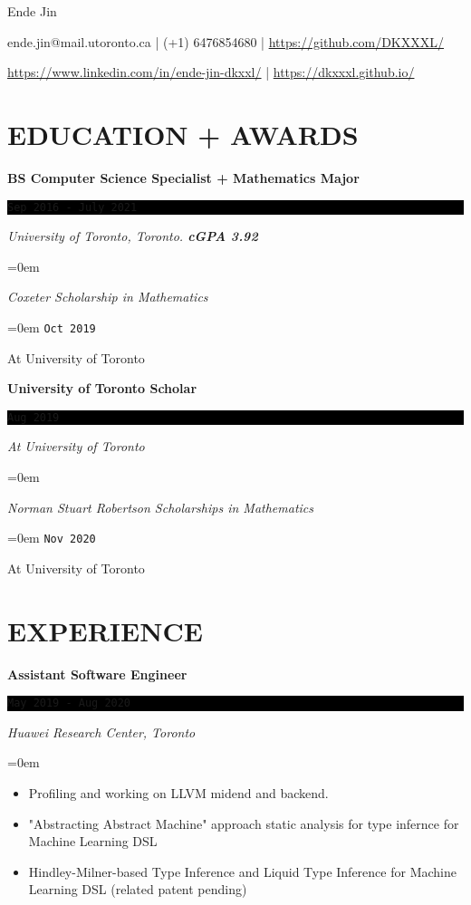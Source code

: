 \documentclass[fontsize=11pt]{article}
\newcommand{\MyName}[1]{ %
    \Huge \usefont{OT1}{phv}{b}{n} \hfill #1
    \par \normalsize \normalfont}
\newcommand{\NewPart}[1]{\section*{\uppercase{#1}}}
\newcommand{\EducationEntry}[4]{
    \noindent \textbf{#1} \hfill      %
    \colorbox{Black}{ 
      \parbox{11em}{
      \centering \color{White}#2}} \par  %
    \noindent \textit{#3} \par        %
    \noindent\hangindent=0em\hangafter=0 \small #4 %
    \normalsize \par}
\newcommand{\WorkEntry}[4]{       %
    \noindent \textbf{#1} \hfill      %
    \colorbox{Black}{%
      \parbox{11em}{%
      \centering\color{White}#2}} \par   %
        \noindent \textit{#3} \par        %
    \noindent\hangindent=0em\hangafter=0 \small #4 %
    \normalsize \par}
\begin{document}
    
\MyName{Ende Jin}
\bigskip
{\small \hfill {\large \faEnvelope} ende.jin@mail.utoronto.ca | {\large \faMobile} (+1) 6476854680 | {\large \faGithubSquare}  \url{https://github.com/DKXXXL/} \par
 \hfill {\large \faLinkedinSquare}  \url{https://www.linkedin.com/in/ende-jin-dkxxl/} | {\large \faWordpress} \url{https://dkxxxl.github.io/}}
\NewPart{Education + Awards}{}
\EducationEntry
{BS Computer Science Specialist + Mathematics Major}
{ \texttt{Sep 2016 - July 2021} }
{University of Toronto, Toronto.    \bf{cGPA 3.92}}

\EducationEntry{Coxeter Scholarship in Mathematics}
{\texttt{Oct 2019}}{At University of Toronto}

\EducationEntry{University of Toronto Scholar}
{\texttt{Aug 2019}}{At University of Toronto}

\EducationEntry{Norman Stuart Robertson Scholarships in Mathematics}
{\texttt{Nov 2020}}{At University of Toronto}

\NewPart{Experience}{}

    
\WorkEntry
{Assistant Software Engineer}
{\texttt{May 2019 - Aug 2020}}
{Huawei Research Center, Toronto}
{\begin{itemize} \itemsep -1pt
    \item Profiling and working on LLVM midend and backend.
    \item "Abstracting Abstract Machine" approach static analysis for type infernce for Machine Learning DSL
    \item Hindley-Milner-based Type Inference and Liquid Type Inference for Machine Learning DSL (related patent pending)
    \end{itemize}}
\end{document}
